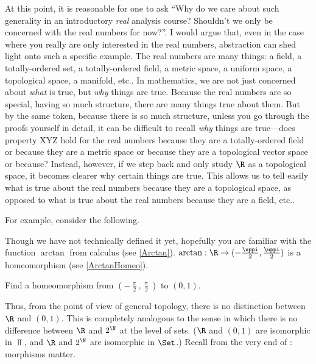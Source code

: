 At this point, it is reasonable for one to ask ``Why do we care about such generality in an introductory \emph{real} analysis course?  Shouldn't we only be concerned with the real numbers for now?''.  I would argue that, even in the case where you really are only interested in the real numbers, abstraction can shed light onto such a specific example.  The real numbers are many things:  a field, a totally-ordered set, a totally-ordered field, a metric space, a uniform space, a topological space, a manifold, etc..  In mathematics, we are not just concerned about \emph{what} is true, but \emph{why} things are true.  Because the real numbers are so special, having so much structure, there are many things true about them.  But by the same token, because there is so much structure, unless you go through the proofs yourself in detail, it can be difficult to recall \emph{why} things are true---does property XYZ hold for the real numbers because they are a totally-ordered field or because they are a metric space or because they are a topological vector space or because\textellipsis ?  Instead, however, if we step back and only study $\R$ as a topological space, it becomes clearer why certain things are true.  This allows us to tell easily what is true about the real numbers because they are a topological space, as opposed to what is true about the real numbers because they are a field, etc..

For example, consider the following.
\begin{exm}{}{}
Though we have not technically defined it yet, hopefully you are familiar with the function $\arctan$ from calculus (see \cref{Arctan}).  $\arctan :\R \rightarrow (-\frac{\uppi}{2},\frac{\uppi}{2})$ is a homeomorphism (see \cref{ArctanHomeo}).
\end{exm}
\begin{exr}{}{}
Find a homeomorphism from $(-\frac{\uppi}{2},\frac{\uppi}{2})$ to $(0,1)$.
\end{exr}
Thus, from the point of view of general topology, there is no distinction between $\R$ and $(0,1)$.  This is completely analogous to the sense in which there is no difference between $\R$ and $2^{\N}$ at the level of sets.  ($\R$ and $(0,1)$ are isomorphic in $\Top$, and $\R$ and $2^{\N}$ are isomorphic in $\Set$.)  Recall from the very end of :  morphisms matter.

